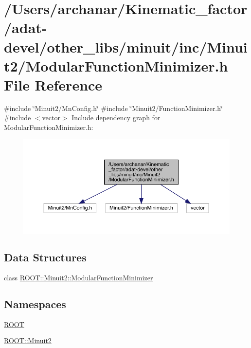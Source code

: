 \hypertarget{adat-devel_2other__libs_2minuit_2inc_2Minuit2_2ModularFunctionMinimizer_8h}{}\section{/\+Users/archanar/\+Kinematic\+\_\+factor/adat-\/devel/other\+\_\+libs/minuit/inc/\+Minuit2/\+Modular\+Function\+Minimizer.h File Reference}
\label{adat-devel_2other__libs_2minuit_2inc_2Minuit2_2ModularFunctionMinimizer_8h}
{\ttfamily \#include \char`\"{}Minuit2/\+Mn\+Config.\+h\char`\"{}}\newline
{\ttfamily \#include \char`\"{}Minuit2/\+Function\+Minimizer.\+h\char`\"{}}\newline
{\ttfamily \#include $<$vector$>$}\newline
Include dependency graph for Modular\+Function\+Minimizer.\+h\+:
\nopagebreak
\begin{figure}[H]
\begin{center}
\leavevmode
\includegraphics[width=350pt]{d4/db7/adat-devel_2other__libs_2minuit_2inc_2Minuit2_2ModularFunctionMinimizer_8h__incl}
\end{center}
\end{figure}
\subsection*{Data Structures}
\begin{DoxyCompactItemize}
\item 
class \mbox{\hyperlink{classROOT_1_1Minuit2_1_1ModularFunctionMinimizer}{R\+O\+O\+T\+::\+Minuit2\+::\+Modular\+Function\+Minimizer}}
\end{DoxyCompactItemize}
\subsection*{Namespaces}
\begin{DoxyCompactItemize}
\item 
 \mbox{\hyperlink{namespaceROOT}{R\+O\+OT}}
\item 
 \mbox{\hyperlink{namespaceROOT_1_1Minuit2}{R\+O\+O\+T\+::\+Minuit2}}
\end{DoxyCompactItemize}
